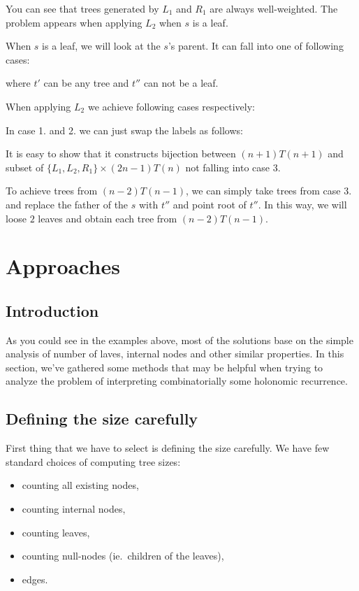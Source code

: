 \documentclass[final]{article}
\theoremstyle{definition}
\theoremstyle{remark}
\begin{document}
You can see that trees generated by \(L_1\) and \(R_1\) are always well-weighted. The problem appears when applying \(L_2\) when \(s\) is a leaf.

When \(s\) is a leaf, we will look at the \(s\)'s parent. It can fall into one of following cases:


where \(t'\) can be any tree and \(t''\) can not be a leaf.

When applying \(L_2\) we achieve following cases respectively:


In case 1. and 2. we can just swap the labels as follows:


It is easy to show that it constructs bijection between \((n + 1) T(n + 1)\) and subset of \(\{L_1, L_2, R_1\} \times (2 n - 1) T(n)\) not falling into case 3.

To achieve trees from \((n - 2) T(n - 1)\), we can simply take trees from case 3. and replace the father of the \(s\) with \(t''\) and point root of \(t''\). In this way, we will loose \(2\) leaves and obtain each tree from \((n - 2) T(n - 1)\).


\section{Approaches}%
\label{sec:approaches}

\subsection{Introduction}%
\label{sub:introduction}

As you could see in the examples above, most of the solutions base on the simple analysis of number of laves, internal nodes and other similar properties. In this section, we've gathered some methods that may be helpful when trying to analyze the problem of interpreting combinatorially some holonomic recurrence.

\subsection{Defining the size carefully}%
\label{sub:defining_the_size_carefully}

First thing that we have to select is defining the size carefully. We have few standard choices of computing tree sizes:
\begin{itemize}
    \item counting all existing nodes,
    \item counting internal nodes,
    \item counting leaves,
    \item counting null-nodes (ie.\ children of the leaves),
    \item edges.
\end{itemize}
\end{document}

